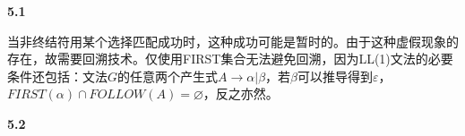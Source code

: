 \documentclass[UTF8]{report}
\newcommand{\tbf}[1]{\textbf{#1}}
\begin{document}
\pagestyle{fancy}

\maketitle

\noindent
\tbf{5.1}

当非终结符用某个选择匹配成功时，这种成功可能是暂时的。由于这种虚假现象的存在，故需要回溯技术。仅使用FIRST集合无法避免回溯，因为LL(1)文法的必要条件还包括：文法$G$的任意两个产生式$A\to\alpha | \beta$，若$\beta$可以推导得到$\varepsilon$，$FIRST(\alpha)\cap FOLLOW(A)=\varnothing$，反之亦然。

\noindent
\tbf{5.2}
\end{document}
